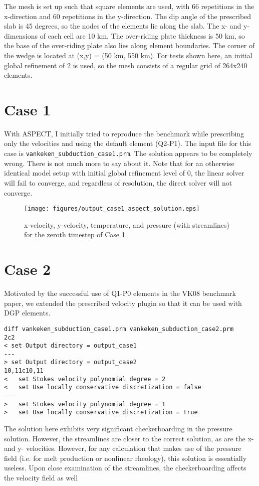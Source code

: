 \documentclass[11pt,letterpaper]{article}
\begin{document}
The mesh is set up such that square elements are used, with 66 repetitions in the x-direction and 60 repetitions in the y-direction. The dip angle of the prescribed slab is 45 degrees, so the nodes of the elements lie along the slab. The x- and y- dimensions of each cell are 10 km. The over-riding plate thickness is 50 km, so the base of the over-riding plate also lies along element boundaries. The corner of the wedge is located at (x,y) = (50 km, 550 km). For tests shown here, an initial global refinement of 2 is used, so the mesh consists of a regular grid of 264x240 elements.

\section{Case 1}
With ASPECT, I initially tried to reproduce the benchmark while prescribing only the velocities and using the default element (Q2-P1). The input file for this case is \texttt{vankeken\_subduction\_case1.prm}. The solution appears to be completely wrong. There is not much more to say about it. Note that for an otherwise identical model setup with initial global refinement level of 0, the linear solver will fail to converge, and regardless of resolution, the direct solver will not converge.

\begin{figure}[!htb]
\texttt{[image: figures/output\_case1\_aspect\_solution.eps]}
\caption{x-velocity, y-velocity, temperature, and pressure (with streamlines) for the zeroth timestep of Case 1.}
\end{figure}

\section{Case 2}
Motivated by the successful use of Q1-P0 elements in the VK08 benchmark paper, we extended the prescribed velocity plugin so that it can be used with DGP elements.
\begin{verbatim}
diff vankeken_subduction_case1.prm vankeken_subduction_case2.prm
2c2
< set Output directory = output_case1
---
> set Output directory = output_case2
10,11c10,11
<   set Stokes velocity polynomial degree = 2
<   set Use locally conservative discretization = false
---
>   set Stokes velocity polynomial degree = 1
>   set Use locally conservative discretization = true

\end{verbatim}

The solution here exhibits very significant checkerboarding in the pressure solution. However, the streamlines are closer to the correct solution, as are the x- and y- velocities. However, for any calculation that makes use of the pressure field (i.e. for melt production or nonlinear rheology), this solution is essentially useless. Upon close examination of the streamlines, the checkerboarding affects the velocity field as well
\end{document}
